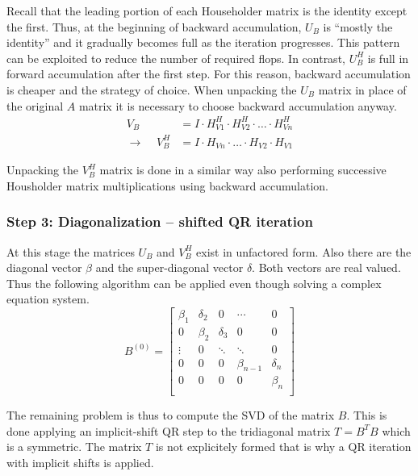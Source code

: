 Recall that the leading portion of each Householder matrix is the
identity except the first.  Thus, at the beginning of backward
accumulation, $U_B$ is ``mostly the identity'' and it gradually
becomes full as the iteration progresses.  This pattern can be
exploited to reduce the number of required flops.  In contrast,
$U_B^H$ is full in forward accumulation after the first step.  For
this reason, backward accumulation is cheaper and the strategy of
choice.  When unpacking the $U_B$ matrix in place of the original $A$
matrix it is necessary to choose backward accumulation anyway.
\begin{align}
V_B\; &= I\cdot H^H_{V1}\cdot H^H_{V2}\cdot \ldots \cdot H^H_{Vn}\\
\rightarrow\;\;\;\; V_B^H &= I\cdot H_{Vn}\cdot \ldots \cdot H_{V2}\cdot H_{V1}
\end{align}

Unpacking the $V_B^H$ matrix is done in a similar way also performing
successive Housholder matrix multiplications using backward
accumulation.

\subsubsection{Step 3: Diagonalization -- shifted QR iteration}

At this stage the matrices $U_B$ and $V_B^H$ exist in unfactored form.
Also there are the diagonal vector $\beta$ and the super-diagonal
vector $\delta$.  Both vectors are real valued.  Thus the following
algorithm can be applied even though solving a complex equation
system.
\begin{equation}
B^{(0)} = 
\begin{bmatrix}
\beta_1 & \delta_2 & 0 & \cdots & 0\\
0 & \beta_2 & \delta_3 & 0 & 0\\
\vdots & 0 & \ddots & \ddots & 0\\
0 & 0 & 0 & \beta_{n-1} & \delta_n\\
0 & 0 & 0 & 0 & \beta_n\\
\end{bmatrix}
\end{equation}

The remaining problem is thus to compute the SVD of the matrix $B$.
This is done applying an implicit-shift QR step to the tridiagonal
matrix $T=B^T B$ which is a symmetric.  The matrix $T$ is not
explicitely formed that is why a QR iteration with implicit shifts is
applied.


